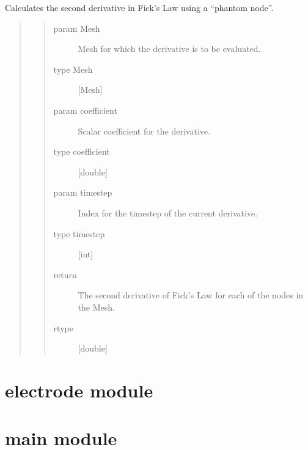 \documentclass[letterpaper,10pt,english]{sphinxmanual}
\begin{document}
\begin{fulllineitems}
\label{\detokenize{derivative:derivative.second_derivative}}
\sphinxAtStartPar
Calculates the second derivative in Fick’s Law using a “phantom node”.
\begin{quote}
\begin{quote}\begin{description}
\item[{param Mesh}] \leavevmode
\sphinxAtStartPar
Mesh for which the derivative is to be evaluated.

\item[{type Mesh}] \leavevmode
\sphinxAtStartPar
{[}Mesh{]}

\item[{param coefficient}] \leavevmode
\sphinxAtStartPar
Scalar coefficient for the derivative.

\item[{type coefficient}] \leavevmode
\sphinxAtStartPar
{[}double{]}

\item[{param timestep}] \leavevmode
\sphinxAtStartPar
Index for the timestep of the current derivative.

\item[{type timestep}] \leavevmode
\sphinxAtStartPar
{[}int{]}

\item[{return}] \leavevmode
\sphinxAtStartPar
The second derivative of Fick’s Law for each of the nodes in the Mesh.

\item[{rtype}] \leavevmode
\sphinxAtStartPar
{[}double{]}

\end{description}\end{quote}
\end{quote}

\end{fulllineitems}



\section{electrode module}
\label{\detokenize{electrode:electrode-module}}\label{\detokenize{electrode::doc}}

\section{main module}
\label{\detokenize{main:main-module}}\label{\detokenize{main::doc}}
\end{document}
